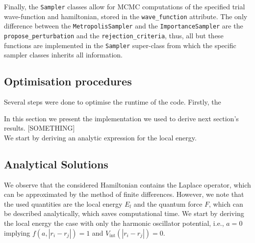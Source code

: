 \documentclass[11pt,a4paper]{article}
\numberwithin{equation}{section}
\begin{document}
Finally, the \texttt{Sampler} classes allow for MCMC computations of the specified trial wave-function and hamiltonian, stored in the \texttt{wave\_function} attribute. The only difference between the \texttt{MetropolisSampler} and the \texttt{ImportanceSampler} are the \texttt{propose\_perturbation} and the \texttt{rejection\_criteria}, thus, all but these functions are implemented in the \texttt{Sampler} super-class from which the specific sampler classes inherits all information.

\subsection{Optimisation procedures}
Several steps were done to optimise the runtime of the code. Firstly, the


In this section we present the implementation we used to derive next section's results. 
%
[SOMETHING]\\
We start by deriving an analytic expression for the local energy. 
\subsection{Analytical Solutions}
%
%
We observe that the considered Hamiltonian contains the Laplace operator, which can be approximated by the method of finite differences.
%
However, we note that the used quantities are the local energy $E_l$ and the quantum force $F$, which can be described analytically, which saves computational time. 
%
We start by deriving the local energy the case with only the harmonic oscillator potential, i.e., $a=0$ implying $f(a,|r_i-r_j|)=1$ and $V_{\mathrm{int}}(|r_i-r_j|)=0$.
%
\end{document}
